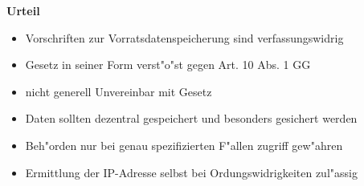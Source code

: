   \begin{frame}
    \textbf{Urteil}
    \begin{itemize}
      \item Vorschriften zur Vorratsdatenspeicherung sind verfassungswidrig
      \item Gesetz in seiner Form verst"o"st gegen Art. 10 Abs. 1 GG
      \item nicht generell Unvereinbar mit Gesetz
      \item Daten sollten dezentral gespeichert und besonders gesichert werden
      \item Beh"orden nur bei genau spezifizierten F"allen zugriff gew"ahren
      \item Ermittlung der IP-Adresse selbst bei Ordungswidrigkeiten zul"assig
    \end{itemize}
  \end{frame}
